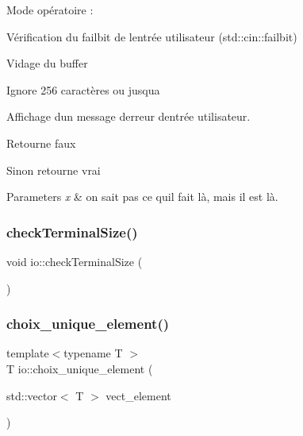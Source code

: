 Mode opératoire \+:
\begin{DoxyItemize}
\item Vérification du failbit de l\textquotesingle{}entrée utilisateur (std\+::cin\+::failbit)
\begin{DoxyEnumerate}
\item Vidage du buffer
\item Ignore 256 caractères ou jusqu\textquotesingle{}a {\ttfamily ~\newline
}
\item Affichage d\textquotesingle{}un message d\textquotesingle{}erreur d\textquotesingle{}entrée utilisateur.
\item Retourne faux
\end{DoxyEnumerate}
\item Sinon retourne vrai 
\begin{DoxyParams}{Parameters}
{\em x} & on sait pas ce qu\textquotesingle{}il fait là, mais il est là. \\
\hline
\end{DoxyParams}

\end{DoxyItemize}\mbox{\label{namespaceio_a5a0d785914a680440e4986a02b50a28e}} 
\subsubsection{\texorpdfstring{check\+Terminal\+Size()}{checkTerminalSize()}}
{\footnotesize\ttfamily void io\+::check\+Terminal\+Size (\begin{DoxyParamCaption}{ }\end{DoxyParamCaption})}

\mbox{\label{namespaceio_a379c013a79ad2d343811725631472b20}} 
\subsubsection{\texorpdfstring{choix\+\_\+unique\+\_\+element()}{choix\_unique\_element()}}
{\footnotesize\ttfamily template$<$typename T $>$ \\
T io\+::choix\+\_\+unique\+\_\+element (\begin{DoxyParamCaption}\item[{std\+::vector$<$ T $>$}]{vect\+\_\+element }\end{DoxyParamCaption})}



